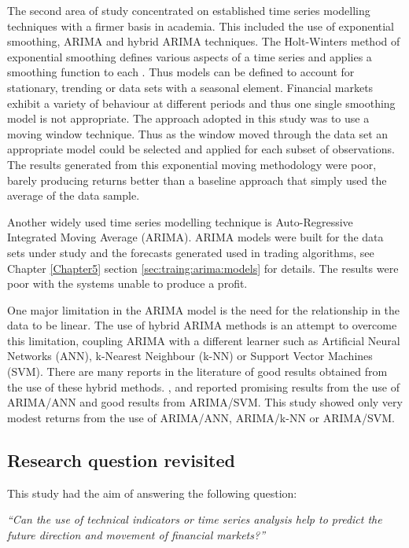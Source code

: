 The second area of study concentrated on established time series modelling techniques with a firmer basis in academia. This included the use of exponential smoothing, ARIMA and hybrid ARIMA techniques. The Holt-Winters method of exponential smoothing defines various aspects of a time series and applies a smoothing function to each \citep{Winters1960}. Thus models can be defined to account for stationary, trending or data sets with a seasonal element. Financial markets exhibit a variety of behaviour at different periods and thus one single smoothing model is not appropriate. The approach adopted in this study was to use a moving window technique. Thus as the window moved through the data set an appropriate model could be selected and applied for each subset of observations. The results generated from this exponential moving methodology were poor, barely producing returns better than a baseline approach that simply used the average of the data sample.

Another widely used time series modelling technique is Auto-Regressive Integrated Moving Average (ARIMA). ARIMA models were built for the data sets under study and the forecasts generated used in trading algorithms, see Chapter \ref{Chapter5} section \ref{sec:traing:arima:models} for details. The results were poor with the systems unable to produce a profit. 

One major limitation in the ARIMA model is the need for the relationship in the data to be linear. The use of hybrid ARIMA methods is an attempt to overcome this limitation, coupling ARIMA with a different learner such as Artificial Neural Networks (ANN), k-Nearest Neighbour (k-NN) or Support Vector Machines (SVM). There are many reports in the literature of good results obtained from the use of these hybrid methods. \cite{Wang2012758}, \cite{Khashei2009956} and \cite{Zhang2003159} reported promising results from the use of ARIMA/ANN and \cite{Pai2005497} good results from ARIMA/SVM. This study showed only very modest returns from the use of ARIMA/ANN, ARIMA/k-NN or ARIMA/SVM.

\subsection{Research question revisited}
This study had the aim of answering the following question:

\textit{\textquotedblleft Can the use of technical indicators or time series analysis help to predict the future direction and movement of financial markets?\textquotedblright}

